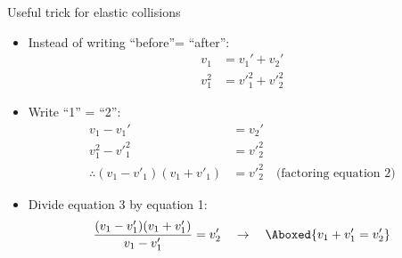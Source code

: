 \documentclass[aspectratio=169,
hyperref={colorlinks,urlcolor=blue}
]{beamer}
\begin{document}
\begin{frame}{Useful trick for elastic collisions}
\begin{itemize}
\item Instead of writing ``before''= ``after'':
\begin{align*}
v_1&= v_1'+v_2'\\
v_1^2&= {v'}_1^{2}+ {v'}_2^{2}
\end{align*}
\item Write ``1'' = ``2'':
\begin{align}
v_1-v_1'&=v_2'\\
v_1^2-{v'}_1^{2}&= {v'}_2^{2}\\
\therefore (v_1-v'_1)(v_1+v'_1)&={v'}_2^{2}\quad\text{(factoring equation 2)}
\end{align}
\item Divide equation 3 by equation 1:
\begin{align*}
\frac{(v_1-v'_1)(v_1+v'_1)}{v_1-v_1'}=v'_2\quad \rightarrow \quad \Aboxed{v_1+v'_1 = v'_2}
\end{align*}
\end{itemize}

\end{frame}
\end{document}
